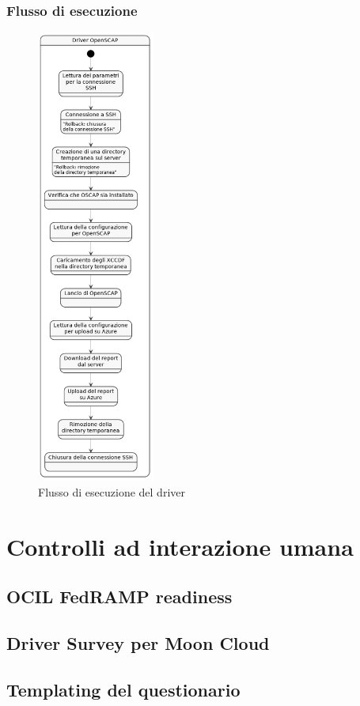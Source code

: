 \documentclass[../main.tex]{subfiles}
\begin{document}
\subsubsection{Flusso di esecuzione}
\begin{figure}[H]
\centering
\includegraphics[height=15cm]{immagini/DRIVER_OPENSCAP.png}
\caption{Flusso di esecuzione del driver}\label{fig:flussodriver1}

\end{figure}

\section{Controlli ad interazione umana}
\subsection{OCIL FedRAMP readiness}
\subsection{Driver Survey per Moon Cloud}
\subsection{Templating del questionario}
\end{document}
